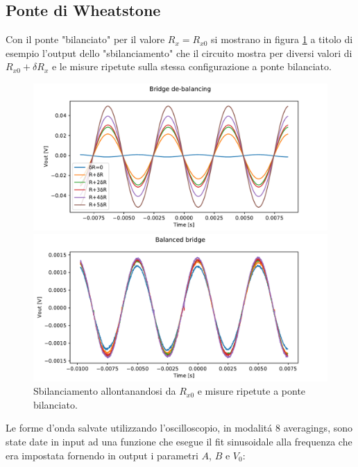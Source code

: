 \subsection{Ponte di Wheatstone}
Con il ponte "bilanciato" per il valore $R_x=R_{x0}$ si mostrano in figura \ref{fig:sbil} a titolo di esempio l'output dello "sbilanciamento" che il circuito mostra per diversi valori di $R_{x0}+\delta R_x$ e le misure ripetute sulla stessa configurazione a ponte bilanciato.\\
\begin{figure}[H]
    \centering
    \begin{minipage}{0.49\textwidth}
        \centering
        \includegraphics[width=\textwidth]{Figure_12.pdf}
    \end{minipage}\hfill
    \begin{minipage}{0.49\textwidth}
        \centering
        \includegraphics[width=\textwidth]{Figure_18.pdf} 
    \end{minipage}
    \caption{Sbilanciamento allontanandosi da $R_{x0}$ e misure ripetute a ponte bilanciato.}
    \label{fig:sbil}
\end{figure}
Le forme d'onda salvate utilizzando l'oscilloscopio, in modalit\'a 8 averagings, sono state date in input ad una funzione che esegue il fit sinusoidale alla frequenza che era impostata fornendo in output i parametri $A$, $B$ e $V_0$:
